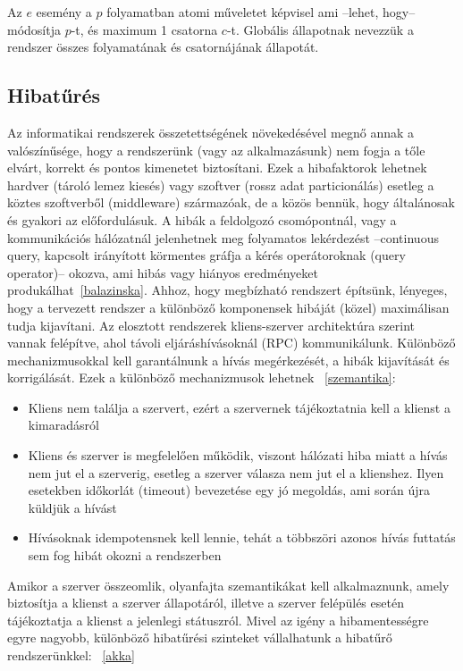 \documentclass[a4paper,12pt]{article}
\begin{document}
Az $e$ esemény a $p$ folyamatban atomi műveletet képvisel ami --lehet, hogy-- módosítja $p$-t, és maximum 1 csatorna $c$-t. Globális állapotnak nevezzük a rendszer összes folyamatának és csatornájának állapotát. \linebreak


\subsection{Hibatűrés}

Az informatikai rendszerek összetettségének növekedésével megnő annak a valószínűsége, hogy a rendszerünk (vagy az alkalmazásunk) nem fogja a tőle elvárt, korrekt és pontos kimenetet biztosítani. Ezek a hibafaktorok lehetnek hardver (tároló lemez kiesés) vagy szoftver (rossz adat particionálás) esetleg a köztes szoftverből (middleware) származóak, de a közös bennük, hogy általánosak és gyakori az előfordulásuk.  A hibák a feldolgozó csomópontnál, vagy a kommunikációs hálózatnál jelenhetnek meg folyamatos lekérdezést --continuous query, kapcsolt irányított körmentes gráfja a kérés operátoroknak (query operator)-- okozva, ami hibás vagy hiányos eredményeket produkálhat~\ref{balazinska}. Ahhoz, hogy megbízható rendszert építsünk, lényeges, hogy a tervezett rendszer a különböző komponensek hibáját (közel) maximálisan tudja kijavítani. Az elosztott rendszerek kliens-szerver architektúra szerint vannak felépítve, ahol távoli eljáráshívásoknál (RPC) kommunikálunk. Különböző mechanizmusokkal kell garantálnunk a hívás megérkezését, a hibák kijavítását és korrigálását. Ezek a különböző mechanizmusok lehetnek ~\ref{szemantika}:

\begin{itemize}
\item Kliens nem találja a szervert, ezért a szervernek tájékoztatnia kell a klienst a kimaradásról
\item Kliens és szerver is megfelelően működik, viszont hálózati hiba miatt a hívás nem jut el a szerverig, esetleg a szerver válasza nem jut el a klienshez. Ilyen esetekben időkorlát (timeout) bevezetése egy jó megoldás, ami során újra küldjük a hívást
\item Hívásoknak idempotensnek kell lennie, tehát a többszöri azonos hívás futtatás sem fog hibát okozni a rendszerben
\end{itemize}

Amikor a szerver összeomlik, olyanfajta szemantikákat kell alkalmaznunk, amely biztosítja a klienst a szerver állapotáról, illetve a szerver felépülés esetén tájékoztatja a klienst a jelenlegi státuszról. \linebreak
Mivel az igény a hibamentességre egyre nagyobb, különböző hibatűrési szinteket vállalhatunk a hibatűrő rendszerünkkel: ~\ref{akka}
\end{document}

